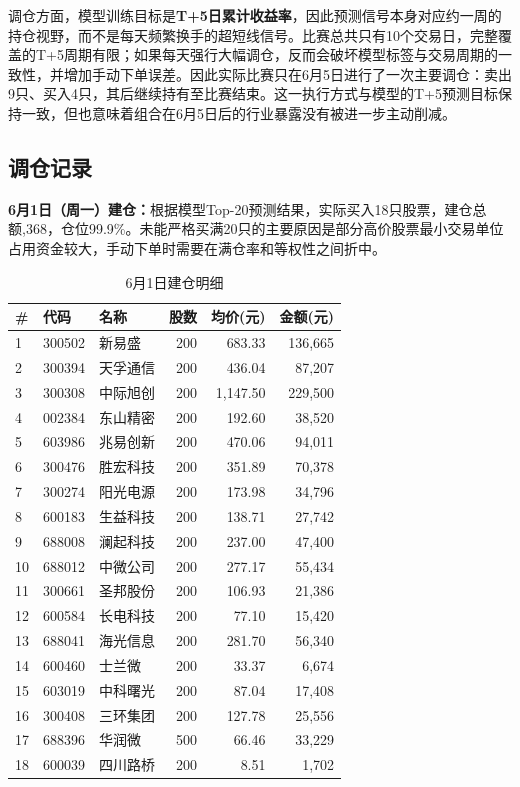 \documentclass[10pt,a4paper]{ctexart}
\begin{document}
调仓方面，模型训练目标是\textbf{T+5日累计收益率}，因此预测信号本身对应约一周的持仓视野，而不是每天频繁换手的超短线信号。比赛总共只有10个交易日，完整覆盖的T+5周期有限；如果每天强行大幅调仓，反而会破坏模型标签与交易周期的一致性，并增加手动下单误差。因此实际比赛只在6月5日进行了一次主要调仓：卖出9只、买入4只，其后继续持有至比赛结束。这一执行方式与模型的T+5预测目标保持一致，但也意味着组合在6月5日后的行业暴露没有被进一步主动削减。

\subsection{调仓记录}

\textbf{6月1日（周一）建仓：}根据模型Top-20预测结果，实际买入18只股票，建仓总额,368，仓位99.9\%。未能严格买满20只的主要原因是部分高价股票最小交易单位占用资金较大，手动下单时需要在满仓率和等权性之间折中。

\begin{table}[htbp]
    \centering
    \caption{6月1日建仓明细}
    \footnotesize
    \begin{tabular}{lllrrr}
        \toprule
        \# & 代码 & 名称 & 股数 & 均价(元) & 金额(元) \\
        \midrule
        1 & 300502 & 新易盛 & 200 & 683.33 & 136,665 \\
        2 & 300394 & 天孚通信 & 200 & 436.04 & 87,207 \\
        3 & 300308 & 中际旭创 & 200 & 1,147.50 & 229,500 \\
        4 & 002384 & 东山精密 & 200 & 192.60 & 38,520 \\
        5 & 603986 & 兆易创新 & 200 & 470.06 & 94,011 \\
        6 & 300476 & 胜宏科技 & 200 & 351.89 & 70,378 \\
        7 & 300274 & 阳光电源 & 200 & 173.98 & 34,796 \\
        8 & 600183 & 生益科技 & 200 & 138.71 & 27,742 \\
        9 & 688008 & 澜起科技 & 200 & 237.00 & 47,400 \\
        10 & 688012 & 中微公司 & 200 & 277.17 & 55,434 \\
        11 & 300661 & 圣邦股份 & 200 & 106.93 & 21,386 \\
        12 & 600584 & 长电科技 & 200 & 77.10 & 15,420 \\
        13 & 688041 & 海光信息 & 200 & 281.70 & 56,340 \\
        14 & 600460 & 士兰微 & 200 & 33.37 & 6,674 \\
        15 & 603019 & 中科曙光 & 200 & 87.04 & 17,408 \\
        16 & 300408 & 三环集团 & 200 & 127.78 & 25,556 \\
        17 & 688396 & 华润微 & 500 & 66.46 & 33,229 \\
        18 & 600039 & 四川路桥 & 200 & 8.51 & 1,702 \\
        \bottomrule
    \end{tabular}
\end{table}
\end{document}
